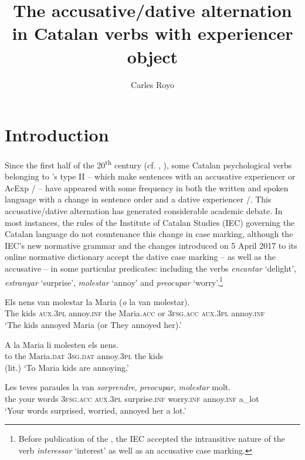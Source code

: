 \documentclass[output=paper,colorlinks,citecolor=brown,modfonts,nonflat]{langsci/langscibook}
\author{Carles Royo\affiliation{Universitat Rovira i Virgili}}
\title{The accusative/dative alternation in Catalan verbs with experiencer object}
\begin{document}
\maketitle
\nocite{DIEC2007}


\section{Introduction}\label{sec:royo:1}

Since the first half of the 20\textsuperscript{th} century (cf. \citealt[16]{Ginebra2003}, \citealt[147]{Ginebra2015}), some Catalan psychological verbs belonging to \citet{BellettiRizzi1988}'s type II – which make sentences with an accusative experiencer or AcExp / – have appeared with some frequency in both the written and spoken language with a change in sentence order and a dative experiencer /. This accusative/dative alternation has generated considerable academic debate. In most instances, the rules of the Institute of Catalan Studies (IEC) governing the Catalan language do not countenance this change in case marking, although the IEC’s new normative grammar \citep{GIEC2016} and the changes introduced on 5 April 2017 to its online normative dictionary \citep{DIEC2007} accept the dative case marking – as well as the accusative – in some particular predicates: including the verbs \textit{encantar} ‘delight’, \textit{estranyar} ‘surprise’, \textit{molestar} ‘annoy’ and \textit{preocupar} ‘worry’.\footnote{Before publication of the \citet{GIEC2016}, the IEC accepted the intransitive nature of the verb \textit{interessar} ‘interest’ as well as an accusative case marking.}

\ea%
 \label{ex:royo:1}
 \ea \label{ex:royo:1a}
 \gll Els nens van molestar la Maria (\emph{o} la van molestar).\\
The kids  \textsc{aux.3pl} annoy.\textsc{inf} the Maria.\textsc{acc} or 3\textsc{fsg.acc} \textsc{aux.3pl} annoy.\textsc{inf}\\
 \glt ‘The kids annoyed Maria (or They annoyed her).’

 \ex \label{ex:royo:1b}
 \gll A la Maria li molesten els nens.\\
 to the Maria.\textsc{dat} \textsc{3sg.dat} annoy.\textsc{3pl} the kids\\
 \glt  (lit.) ‘To Maria kids are annoying.’
 \z
 \z

\ea%
 \label{ex:royo:2} \citealt[77]{CabréMateu1998}
 \ea \label{ex:royo:2a}
 \gll Les teves paraules la van \emph{sorprendre}, \emph{preocupar}, \emph{molestar} molt.\\
the  your words     \textsc{3fsg.acc} \textsc{aux.3pl} surprise.\textsc{inf} worry.\textsc{inf}  annoy.\textsc{inf} a\_lot\\
 \glt ‘Your words surprised, worried, annoyed her a lot.’
\end{document}
